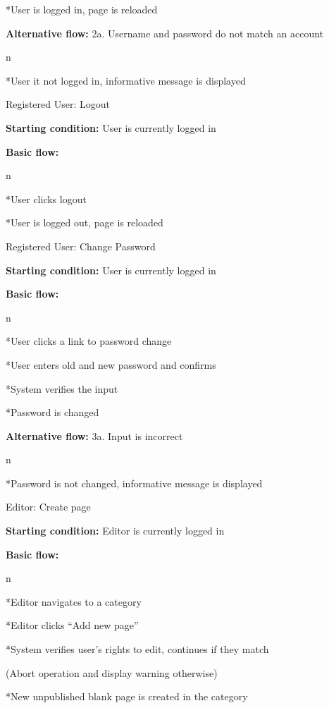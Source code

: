 *User is logged in, page is reloaded

\enditems

{\bf Alternative flow:} 2a. Username and password do not match an account

\begitems \style n

*User it not logged in, informative message is displayed

\enditems

\secc Registered User: Logout

{\bf Starting condition:} User is currently logged in

{\bf Basic flow:}

\begitems \style n

*User clicks logout

*User is logged out, page is reloaded

\enditems

\secc Registered User: Change Password

{\bf Starting condition:} User is currently logged in

{\bf Basic flow:}

\begitems \style n

*User clicks a link to password change

*User enters old and new password and confirms

*System verifies the input

*Password is changed

\enditems

{\bf Alternative flow:} 3a. Input is incorrect

\begitems \style n

*Password is not changed, informative message is displayed

\enditems

\secc Editor: Create page

{\bf Starting condition:} Editor is currently logged in

{\bf Basic flow:}

\begitems \style n

*Editor navigates to a category

*Editor clicks “Add new page”

*System verifies user’s rights to edit, continues if they match

(Abort operation and display warning otherwise)

*New unpublished blank page is created in the category

\enditems

